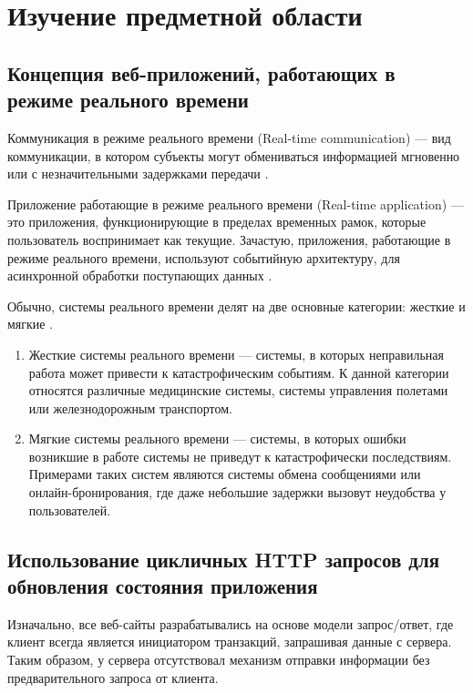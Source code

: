 \chapter{Изучение предметной области}

\section{Концепция веб-приложений, работающих в режиме реального времени}

Коммуникация в режиме реального времени (Real-time communication) — вид коммуникации, в котором субъекты могут обмениваться информацией мгновенно или с незначительными задержками передачи \cite{RealTimeCommunicationBase}.

Приложение работающие в режиме реального времени (Real-time application) — это приложения, функционирующие в пределах временных рамок, которые пользователь воспринимает как текущие. Зачастую, приложения, работающие в режиме реального времени, используют событийную архитектуру, для асинхронной обработки поступающих данных \cite{RealTimeCommunicationBaseTwo}.

Обычно, системы реального времени делят на две основные категории: жесткие и мягкие \cite{IntroRealTimeEthrenet}.

\begin{enumerate} 
  \item Жесткие системы реального времени — системы, в которых неправильная работа может привести к катастрофическим событиям. К данной категории относятся различные медицинские системы, системы управления полетами или железнодорожным транспортом.
  
  \item Мягкие системы реального времени — системы, в которых ошибки возникшие в работе системы не приведут к катастрофически последствиям. Примерами таких систем являются системы обмена сообщениями или онлайн-бронирования, где даже небольшие задержки вызовут неудобства у пользователей.
\end{enumerate}

\section{Использование цикличных HTTP запросов для обновления состояния приложения}

Изначально, все веб-сайты разрабатывались на основе модели запрос/ответ, где клиент всегда является инициатором транзакций, запрашивая данные с сервера. Таким образом, у сервера отсутствовал механизм отправки информации без предварительного запроса от клиента.

